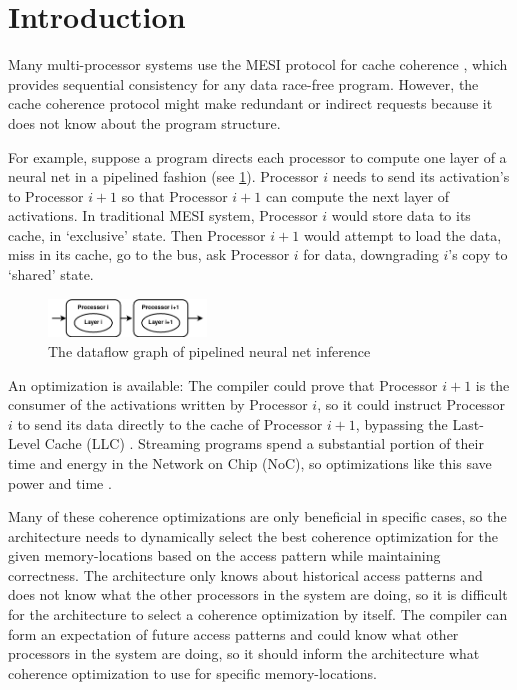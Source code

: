 \section{Introduction}

Many multi-processor systems use the MESI protocol for cache coherence \cite{Primer_on_Memory_Consistency}, which provides sequential consistency for any data race-free program. However, the cache coherence protocol might make redundant or indirect requests because it does not know about the program structure.

For example, suppose a program directs each processor to compute one layer of a neural net in a pipelined fashion (see \cref{fig:pipelined_net}). Processor \(i\) needs to send its activation's to Processor \(i+1\) so that Processor \(i+1\) can compute the next layer of activations. In traditional MESI system, Processor \(i\) would store data to its cache, in `exclusive' state. Then Processor \(i+1\) would attempt to load the data, miss in its cache, go to the bus, ask Processor \(i\) for data, downgrading \(i\)'s copy to `shared' state.

\begin{figure}[h]
  \centering
  \includegraphics[width=0.375\textwidth]{pipelined_parallelism.png}
  \caption{The dataflow graph of pipelined neural net inference}
  \label{fig:pipelined_net}
\end{figure}

An optimization is available: The compiler could prove that Processor \(i+1\) is the consumer of the activations written by Processor \(i\), so it could instruct Processor \(i\) to send its data directly to the cache of Processor \(i+1\), bypassing the Last-Level Cache (LLC) \cite{DeNovo}.  Streaming programs spend a substantial portion of their time and energy in the Network on Chip (NoC), so optimizations like this save power and time \cite{dynamic_cache_coherence}.

Many of these coherence optimizations are only beneficial in specific cases, so the architecture needs to dynamically select the best coherence optimization for the given memory-locations based on the access pattern while maintaining correctness. The architecture only knows about historical access patterns and does not know what the other processors in the system are doing, so it is difficult for the architecture to select a coherence optimization by itself. The compiler can form an expectation of future access patterns and could know what other processors in the system are doing, so it should inform the architecture what coherence optimization to use for specific memory-locations.

